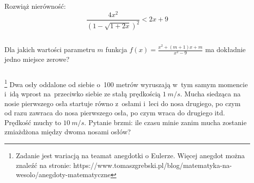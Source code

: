 








%

\begin{zada}
Rozwiąż nierówność:
\[\frac{4x^2}{(1-\sqrt{1+2x})^2} < 2x+9 \]
\end{zada}

$ $

\begin{zada} %
Dla jakich wartości parametru $m$ funkcja $f(x)=\frac{x^2+(m+1)x+m}{x^2-9}$ ma dokładnie jedno miejsce zerowe?
\end{zada}


$ $

\begin{zada}\footnote{Zadanie jest wariacją na teamat anegdotki o Eulerze. Więcej anegdot można znaleźć na stronie:  https://www.tomaszgrebski.pl/blog/matematyka-na-wesolo/anegdoty-matematyczne}
Dwa osły oddalone od siebie o~100 metrów wyruszają w~tym samym momencie i~idą wprost na~przeciwko siebie ze stałą prędkością $1~m/s.$ Mucha siedząca na nosie pierwszego osła startuje równo z~osłami i~leci do nosa drugiego, po czym od razu zawraca do nosa pierwszego osła, po czym wraca do drugiego itd. Prędkość muchy to $10~m/s.$ Pytanie brzmi: ile czasu minie zanim mucha zostanie zmiażdżona między dwoma nosami osłów?\\ 
\end{zada}

